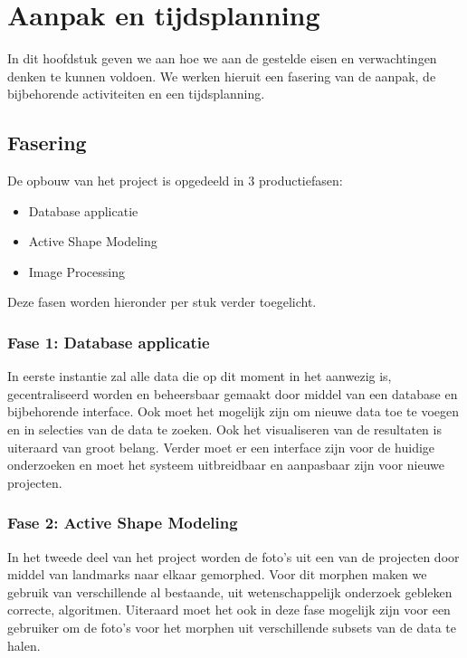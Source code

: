 \section{Aanpak en tijdsplanning}
\label{aanpak_en_tijdsplanning}

In dit hoofdstuk geven we aan hoe we aan de gestelde eisen en verwachtingen denken te kunnen voldoen. 
We werken hieruit een fasering van de aanpak, de bijbehorende activiteiten en een tijdsplanning.

\subsection{Fasering}

De opbouw van het project is opgedeeld in 3 productiefasen:
\begin{itemize}
	\item Database applicatie
	\item Active Shape Modeling
	\item Image Processing
\end{itemize}
Deze fasen worden hieronder per stuk verder toegelicht.

\subsubsection{Fase 1: Database applicatie}
In eerste instantie zal alle data die op dit moment in het \casamproject aanwezig is, gecentraliseerd worden en beheersbaar gemaakt door middel van een database en bijbehorende interface. 
Ook moet het mogelijk zijn om nieuwe data toe te voegen en in selecties van de data te zoeken. 
Ook het visualiseren van de resultaten is uiteraard van groot belang. 
Verder moet er een interface zijn voor de huidige onderzoeken en moet het systeem uitbreidbaar en aanpasbaar zijn voor nieuwe projecten.

\subsubsection{Fase 2: Active Shape Modeling}
In het tweede deel van het project worden de foto's uit een van de projecten door middel van landmarks naar elkaar gemorphed. 
Voor dit morphen maken we gebruik van verschillende al bestaande, uit wetenschappelijk onderzoek gebleken correcte, algoritmen.
Uiteraard moet het ook in deze fase mogelijk zijn voor een gebruiker om de foto's voor het morphen uit verschillende subsets van de data te halen.

